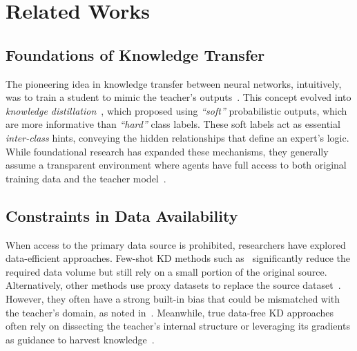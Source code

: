\section{Related Works} \label{sec:42-research02-related}
\subsection{Foundations of Knowledge Transfer} \label{ch4:ssec:02-related-kd}
\begin{foldable} %
    The pioneering idea in knowledge transfer between neural networks, intuitively, was to train a student to mimic the teacher's outputs~\cite{bucila2006}.
    This concept evolved into \textit{knowledge distillation}~\cite{hinton2015distilling}, which proposed using \textit{``soft''} probabilistic outputs, which are more informative than \textit{``hard''} class labels.
    These soft labels act as essential \textit{inter-class} hints, conveying the hidden relationships that define an expert's logic.
    While foundational research has expanded these mechanisms, they generally assume a transparent environment where agents have full access to both original training data and the teacher model~\cite{romero2015, nguyen2021knowledge}.
\end{foldable}

\subsection{Constraints in Data Availability} \label{ch4:ssec:02-related-dfkd}
\begin{foldable} %
    When access to the primary data source is prohibited, researchers have explored data-efficient approaches.
    Few-shot KD methods such as~\cite{wang2020neural, nguyen2022black, vo2024improving} significantly reduce the required data volume but still rely on a small portion of the original source.
    Alternatively, other methods use proxy datasets to replace the source dataset~\cite{chen2021learning, tang2023distribution}.
    However, they often have a strong built-in bias that could be mismatched with the teacher's domain, as noted in~\cite{torralba2011unbiased}.
    Meanwhile, true data-free KD approaches often rely on dissecting the teacher's internal structure or leveraging its gradients as guidance to harvest knowledge~\cite{chen2019data, fang2021contrastive, do2022momentum, tran2024nayer}.
\end{foldable}

